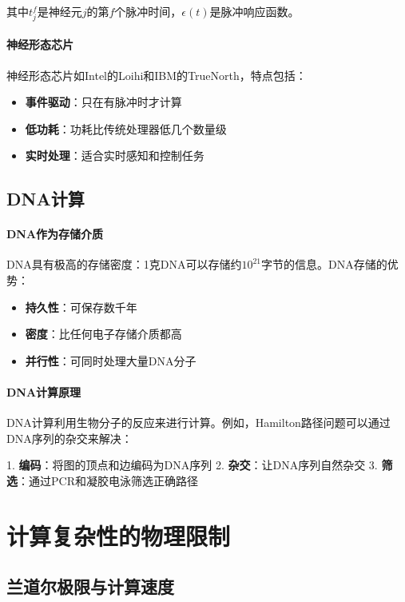 其中$t_j^f$是神经元$j$的第$f$个脉冲时间，$\epsilon(t)$是脉冲响应函数。

\paragraph{神经形态芯片}
神经形态芯片如Intel的Loihi和IBM的TrueNorth，特点包括：
\begin{itemize}
\item \textbf{事件驱动}：只在有脉冲时才计算
\item \textbf{低功耗}：功耗比传统处理器低几个数量级
\item \textbf{实时处理}：适合实时感知和控制任务
\end{itemize}

\subsection{DNA计算}

\paragraph{DNA作为存储介质}
DNA具有极高的存储密度：1克DNA可以存储约$10^{21}$字节的信息。DNA存储的优势：
\begin{itemize}
\item \textbf{持久性}：可保存数千年
\item \textbf{密度}：比任何电子存储介质都高
\item \textbf{并行性}：可同时处理大量DNA分子
\end{itemize}

\paragraph{DNA计算原理}
DNA计算利用生物分子的反应来进行计算。例如，Hamilton路径问题可以通过DNA序列的杂交来解决：

1. \textbf{编码}：将图的顶点和边编码为DNA序列
2. \textbf{杂交}：让DNA序列自然杂交
3. \textbf{筛选}：通过PCR和凝胶电泳筛选正确路径

\section{计算复杂性的物理限制}

\subsection{兰道尔极限与计算速度}

